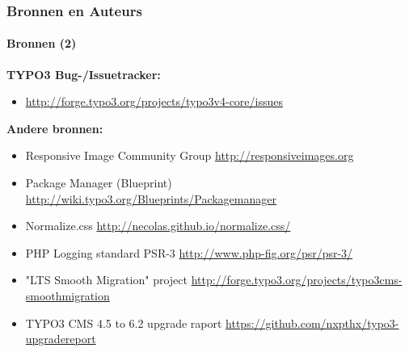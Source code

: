
\begin{frame}[fragile]
	\frametitle{Bronnen en Auteurs}
	\framesubtitle{Bronnen (2)}

	\textbf{TYPO3 Bug-/Issuetracker:}
		\begin{itemize}\smaller
			\item \url{http://forge.typo3.org/projects/typo3v4-core/issues}
		\end{itemize}

	\textbf{Andere bronnen:}
		\begin{itemize}\smaller

			\item Responsive Image Community Group\newline
				\url{http://responsiveimages.org}

			\item Package Manager (Blueprint)\newline
				\url{http://wiki.typo3.org/Blueprints/Packagemanager}

			\item Normalize.css\newline
				\url{http://necolas.github.io/normalize.css/}

			\item PHP Logging standard PSR-3\newline
				\url{http://www.php-fig.org/psr/psr-3/}

			\item "LTS Smooth Migration" project\newline
				\url{http://forge.typo3.org/projects/typo3cms-smoothmigration}

			\item TYPO3 CMS 4.5 to 6.2 upgrade raport
				\url{https://github.com/nxpthx/typo3-upgradereport}

		\end{itemize}

\end{frame}


